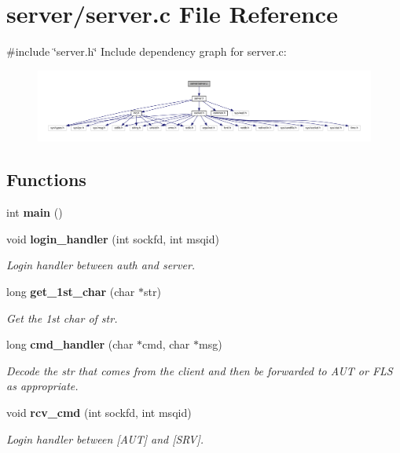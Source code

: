 \section{server/server.c File Reference}
\label{server_8c}
{\ttfamily \#include \char`\"{}server.\+h\char`\"{}}\newline
Include dependency graph for server.\+c\+:\nopagebreak
\begin{figure}[H]
\begin{center}
\leavevmode
\includegraphics[width=350pt]{server_8c__incl}
\end{center}
\end{figure}
\subsection*{Functions}
\begin{DoxyCompactItemize}
\item 
int \textbf{ main} ()
\item 
void \textbf{ login\+\_\+handler} (int sockfd, int msqid)
\begin{DoxyCompactList}\small\item\em Login handler between auth and server. \end{DoxyCompactList}\item 
long \textbf{ get\+\_\+1st\+\_\+char} (char $\ast$str)
\begin{DoxyCompactList}\small\item\em Get the 1st char of str. \end{DoxyCompactList}\item 
long \textbf{ cmd\+\_\+handler} (char $\ast$cmd, char $\ast$msg)
\begin{DoxyCompactList}\small\item\em Decode the str that comes from the client and then be forwarded to A\+UT or F\+LS as appropriate. \end{DoxyCompactList}\item 
void \textbf{ rcv\+\_\+cmd} (int sockfd, int msqid)
\begin{DoxyCompactList}\small\item\em Login handler between [A\+UT] and [S\+RV]. \end{DoxyCompactList}\end{DoxyCompactItemize}


